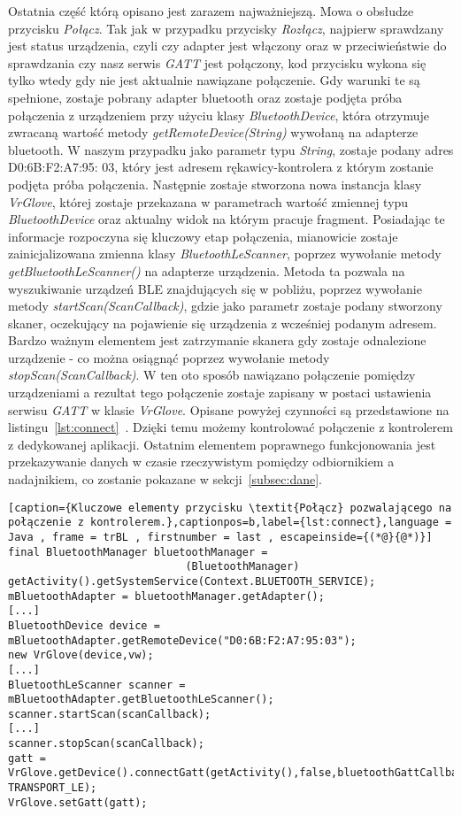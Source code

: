 Ostatnia część którą opisano jest zarazem najważniejszą. Mowa o obsłudze przycisku \textit{Połącz}. Tak jak w przypadku przycisky \textit{Rozłącz}, najpierw sprawdzany jest status urządzenia, czyli czy adapter jest włączony oraz w przeciwieństwie do sprawdzania czy nasz serwis \textit{GATT} jest połączony, kod przycisku wykona się tylko wtedy gdy nie jest aktualnie nawiązane połączenie. Gdy warunki te są spełnione, zostaje pobrany adapter bluetooth oraz zostaje podjęta próba połączenia z urządzeniem przy użyciu klasy \textit{BluetoothDevice}, która otrzymuje zwracaną wartość metody \textit{getRemoteDevice(String)} wywołaną na adapterze bluetooth. W naszym przypadku jako parametr typu \textit{String}, zostaje podany adres D0:6B:F2:A7:95: 03, który jest adresem rękawicy-kontrolera z którym zostanie podjęta próba połączenia. Następnie zostaje stworzona nowa instancja klasy \textit{VrGlove}, której zostaje przekazana w parametrach wartość zmiennej typu \textit{BluetoothDevice} oraz aktualny widok na którym pracuje fragment. Posiadając te informacje rozpoczyna się kluczowy etap połączenia, mianowicie zostaje zainicjalizowana zmienna klasy \textit{BluetoothLeScanner}, poprzez wywołanie metody \textit{getBluetoothLeScanner()} na adapterze urządzenia. Metoda ta pozwala na wyszukiwanie urządzeń BLE znajdujących się w pobliżu, poprzez wywołanie metody \textit{startScan(ScanCallback)}, gdzie jako parametr zostaje podany stworzony skaner, oczekujący na pojawienie się urządzenia z wcześniej podanym adresem. Bardzo ważnym elementem jest zatrzymanie skanera gdy zostaje odnalezione urządzenie - co można osiągnąć poprzez wywołanie metody \textit{stopScan(ScanCallback)}. W ten oto sposób nawiązano połączenie pomiędzy urządzeniami a rezultat tego połączenie zostaje zapisany w postaci ustawienia serwisu \textit{GATT} w klasie \textit{VrGlove}. Opisane powyżej czynności są przedstawione na listingu~\ref{lst:connect}~\cite{AndroidDoc}. Dzięki temu możemy kontrolować połączenie z kontrolerem z dedykowanej aplikacji. Ostatnim elementem poprawnego funkcjonowania jest przekazywanie danych w czasie rzeczywistym pomiędzy odbiornikiem a nadajnikiem, co zostanie pokazane w sekcji~\ref{subsec:dane}. \newpage
\begin{lstlisting}[caption={Kluczowe elementy przycisku \textit{Połącz} pozwalającego na połączenie z kontrolerem.},captionpos=b,label={lst:connect},language = Java , frame = trBL , firstnumber = last , escapeinside={(*@}{@*)}]
final BluetoothManager bluetoothManager =
                            (BluetoothManager) getActivity().getSystemService(Context.BLUETOOTH_SERVICE);
mBluetoothAdapter = bluetoothManager.getAdapter();
[...]
BluetoothDevice device = mBluetoothAdapter.getRemoteDevice("D0:6B:F2:A7:95:03");
new VrGlove(device,vw);                    
[...]
BluetoothLeScanner scanner = mBluetoothAdapter.getBluetoothLeScanner();
scanner.startScan(scanCallback);
[...]
scanner.stopScan(scanCallback);
gatt = VrGlove.getDevice().connectGatt(getActivity(),false,bluetoothGattCallback, TRANSPORT_LE);
VrGlove.setGatt(gatt);                                                           
\end{lstlisting} 

